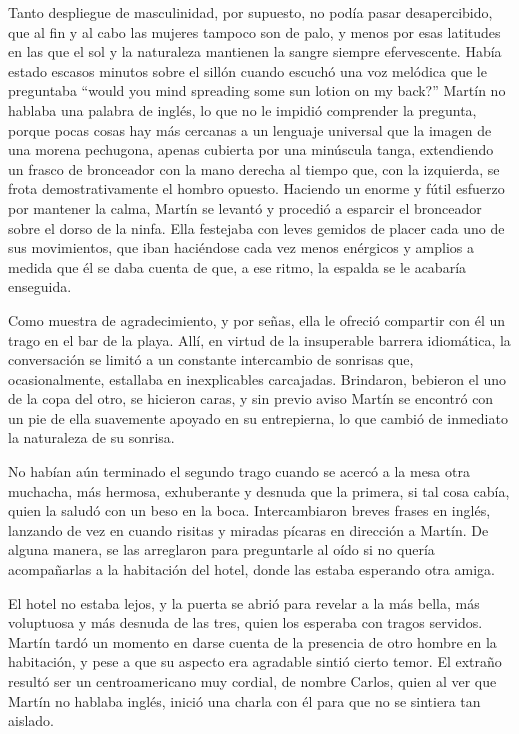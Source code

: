 \documentclass[12pt,twoside,openright,a5paper]{book}
\begin{document}
Tanto despliegue de masculinidad, por supuesto, no podía pasar desapercibido,
que al fin y al cabo las mujeres tampoco son de palo, y menos por esas
latitudes en las que el sol y la naturaleza mantienen la sangre siempre
efervescente. Había estado escasos minutos sobre el sillón cuando escuchó
una voz melódica que le preguntaba “would you mind spreading some sun
lotion on my back?” Martín no hablaba una palabra de inglés, lo que no
le impidió comprender la pregunta, porque pocas cosas hay más cercanas a
un lenguaje universal que la imagen de una morena pechugona, apenas cubierta
por una minúscula tanga, extendiendo un frasco de bronceador con la mano
derecha al tiempo que, con la izquierda, se frota demostrativamente el
hombro opuesto. Haciendo un enorme y fútil esfuerzo por mantener la calma,
Martín se levantó y procedió a esparcir el bronceador sobre el dorso de la
ninfa. Ella festejaba con leves gemidos de placer cada uno de sus movimientos,
que iban haciéndose cada vez menos enérgicos y amplios a medida que él
se daba cuenta de que, a ese ritmo, la espalda se le acabaría enseguida.

Como muestra de agradecimiento, y por señas, ella le ofreció
compartir con él un trago en el bar de la playa. Allí, en virtud de la
insuperable barrera idiomática, la conversación se limitó a un constante
intercambio de sonrisas que, ocasionalmente, estallaba en inexplicables
carcajadas. Brindaron, bebieron el uno de la copa del otro, se hicieron caras,
y sin previo aviso Martín se encontró con un pie de ella suavemente apoyado
en su entrepierna, lo que cambió de inmediato la naturaleza de su sonrisa.

No habían aún terminado el segundo trago cuando se acercó a la mesa
otra muchacha, más hermosa, exhuberante y desnuda que la primera, si tal
cosa cabía, quien la saludó con un beso en la boca. Intercambiaron breves
frases en inglés, lanzando de vez en cuando risitas y miradas pícaras en
dirección a Martín. De alguna manera, se las arreglaron para preguntarle
al oído si no quería acompañarlas a la habitación del hotel, donde las
estaba esperando otra amiga.

El hotel no estaba lejos, y la puerta se abrió para revelar a la más bella,
más voluptuosa y más desnuda de las tres, quien los esperaba con tragos
servidos. Martín tardó un momento en darse cuenta de la presencia de otro
hombre en la habitación, y pese a que su aspecto era agradable sintió
cierto temor. El extraño resultó ser un centroamericano muy cordial,
de nombre Carlos, quien al ver que Martín no hablaba inglés, inició una
charla con él para que no se sintiera tan aislado.
\end{document}
